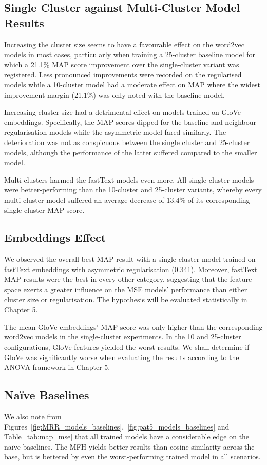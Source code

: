 \subsection{Single Cluster against Multi-Cluster Model Results}
Increasing the cluster size seems to have a favourable effect on the word2vec models in most cases, particularly when training a 25-cluster baseline model for which a 21.1\% \ac{MAP} score improvement over the single-cluster variant was registered.  Less pronounced improvements were recorded on the regularised models while a 10-cluster model had a moderate effect on \ac{MAP} where the widest improvement margin (21.1\%) was only noted with the baseline model.  

Increasing cluster size had a detrimental effect on models trained on GloVe embeddings.  Specifically, the \ac{MAP} scores dipped for the baseline and neighbour regularisation models while the asymmetric model fared similarly.  The deterioration was not as conspicuous between the single cluster and 25-cluster models, although the performance of the latter suffered compared to the smaller model.  

Multi-clusters harmed the fastText models even more.  All single-cluster models were better-performing than the 10-cluster and 25-cluster variants, whereby every multi-cluster model suffered an average decrease of 13.4\% of its corresponding single-cluster \ac{MAP} score.  

\subsection{Embeddings Effect} \label{ustalov_embeddings}
We observed the overall best \ac{MAP} result with a single-cluster model trained on fastText embeddings with asymmetric regularisation (0.341).  Moreover, fastText \ac{MAP} results were the best in every other category, suggesting that the feature space exerts a greater influence on the \ac{MSE} models' performance than either cluster size or regularisation.  The hypothesis will be evaluated statistically in Chapter 5.

The mean GloVe embeddings' \ac{MAP} score was only higher than the corresponding word2vec models in the single-cluster experiments.  In the 10 and 25-cluster configurations, GloVe features yielded the worst results.  We shall determine if GloVe was significantly worse when evaluating the results according to the \ac{ANOVA} framework in Chapter 5.

\subsection{Na\"ive Baselines}
We also note from Figures~\ref{fig:MRR_models_baselines},~\ref{fig:pat5_models_baselines} and Table~\ref{tab:map_mse} that all trained models have a considerable edge on the na\"ive baselines.  The \ac{MFH} yields better results than cosine similarity across the base, but is bettered by even the worst-performing trained model in all scenarios.  

